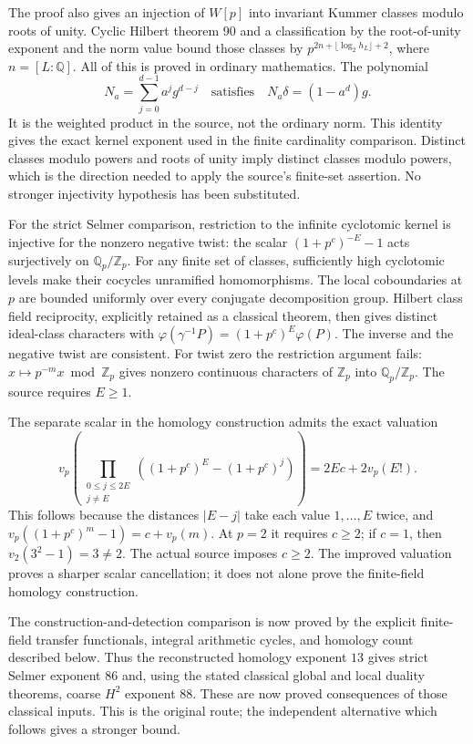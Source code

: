 \documentclass[11pt,a4paper]{article}
\theoremstyle{remark}
\newcommand{\Z}{\mathbb Z}
\newcommand{\Q}{\mathbb Q}
\begin{document}
The proof also gives an injection of $W[p]$ into invariant
Kummer classes modulo roots of unity. Cyclic Hilbert theorem 90
and a classification by the root-of-unity exponent and the norm
value bound those classes by
$p^{2n+\lfloor\log_2h_L\rfloor+2}$, where $n=[L:\Q]$.
All of this is proved in ordinary mathematics. The polynomial
\[
             N_a=\sum_{j=0}^{d-1}a^j g^{d-j}
       \quad\text{satisfies}\quad
             N_a\delta=(1-a^d)g.
\]
It is the weighted product in the source, not the ordinary norm.
This identity gives the exact kernel exponent used in the finite
cardinality comparison. Distinct classes modulo powers and roots
of unity imply distinct classes modulo powers, which is the
direction needed to apply the source's finite-set assertion.
No stronger injectivity hypothesis has been substituted.

For the strict Selmer comparison, restriction to the infinite
cyclotomic kernel is injective for the nonzero negative twist:
the scalar $(1+p^c)^{-E}-1$ acts surjectively on $\Q_p/\Z_p$.
For any finite set of classes, sufficiently high cyclotomic
levels make their cocycles unramified homomorphisms. The local
coboundaries at $p$ are bounded uniformly over every conjugate
decomposition group. Hilbert class field reciprocity, explicitly
retained as a classical theorem, then gives distinct ideal-class
characters with
$\varphi(\gamma^{-1}P)=(1+p^c)^E\varphi(P)$.
The inverse and the negative twist are consistent.
For twist zero the restriction argument fails:
$x\mapsto p^{-m}x\bmod\Z_p$ gives nonzero continuous
characters of $\Z_p$ into $\Q_p/\Z_p$.
The source requires $E\ge1$.

The separate scalar in the homology construction admits the
exact valuation
\[
 v_p\!\left(\prod_{\substack{0\le j\le2E\\j\ne E}}
       ((1+p^c)^E-(1+p^c)^j)\right)=2Ec+2v_p(E!).
\]
This follows because the distances $|E-j|$ take each value
$1,\ldots,E$ twice, and
$v_p((1+p^c)^m-1)=c+v_p(m)$.
At $p=2$ it requires $c\ge2$; if $c=1$, then
$v_2(3^2-1)=3\ne2$.
The actual source imposes $c\ge2$.
The improved valuation proves a sharper scalar cancellation;
it does not alone prove the finite-field homology construction.

The construction-and-detection comparison is now proved by the
explicit finite-field transfer functionals, integral arithmetic
cycles, and homology count described below. Thus the reconstructed
homology exponent $13$ gives strict Selmer exponent $86$ and,
using the stated classical global and local duality theorems,
coarse $H^2$ exponent $88$. These are now proved consequences
of those classical inputs. This is the original route;
the independent alternative which follows gives a stronger bound.
\end{document}
